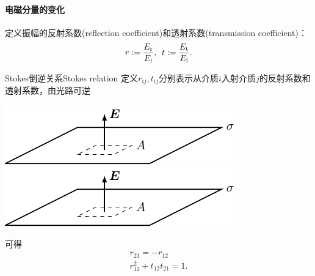 \paragraph{电磁分量的变化}

定义振幅的反射系数(reflection coefficient)和透射系数(transmission coefficient)：
\[
    r:=\frac{E_\text r}{E_{\mathrm{i}}},\enspace t:=\frac{E_\text t}{E_{\mathrm{i}}}.
\]

\begin{theorem}
    {Stokes倒逆关系}{Stokes relation}
    定义$r_{ij},t_{ij}$分别表示从介质$i$入射介质$j$的反射系数和透射系数，由光路可逆
    \begin{center}
        \includegraphics[page=23]{figures/tikz/layouts.pdf}
        \includegraphics[page=24]{figures/tikz/layouts.pdf}
    \end{center}
    可得
    \begin{subequations}
        \begin{gather}
            r_{21}=-r_{12}\\
            r_{12}^2+t_{12}t_{21}=1.
        \end{gather}
    \end{subequations}
\end{theorem}

